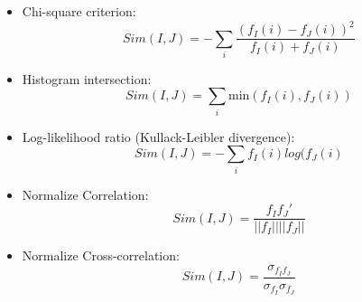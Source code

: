 \begin{itemize}

\item Chi-square criterion:
\begin{equation}
Sim(I, J) = -  \sum_{i} \frac{ (f_{I}(i) - f_{J}(i) )^2}{f_{I}(i) + f_{J}(i)}
\end{equation}

\item Histogram intersection:
\begin{equation}
Sim(I, J) = \sum_{i} \mbox{min}(f_{I}(i),f_{J}(i))
\end{equation}

\item Log-likelihood ratio (Kullack-Leibler 
divergence):
\begin{equation}
Sim(I, J) = - \sum_{i} f_{I}(i)log(f_{J}(i)
\end{equation}

\item Normalize Correlation:
\begin{equation}
Sim(I, J) = \frac{f_{I}f_{J}'}{||f_{I}|| ||f_{J}||}
\end{equation}

\item Normalize Cross-correlation:
\begin{equation}
Sim(I, J) = \frac{\sigma_{f_{I}f_{J}}}{\sigma_{f_{I}}\sigma_{f_{J}}}
\end{equation}

\end{itemize}